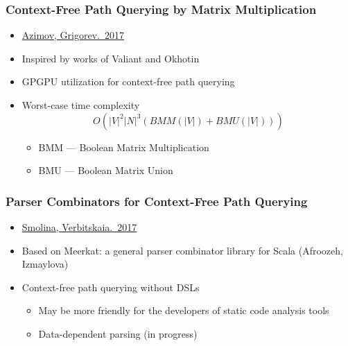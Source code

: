 \documentclass[xcolor=table]{beamer}
\begin{document}
\begin{frame}
  \transwipe[direction=90]
  \frametitle{Context-Free Path Querying by Matrix Multiplication}
  \begin{itemize}
    \item \href{https://arxiv.org/abs/1707.01007}{Azimov, Grigorev.~2017}
    \item Inspired by works of Valiant and Okhotin    
    \item GPGPU utilization for context-free path querying
    \item Worst-case time complexity $$O(|V|^2 |N|^3 (BMM(|V|) + BMU(|V|)))$$
    \begin{itemize}
      \item BMM --- Boolean Matrix Multiplication
      \item BMU --- Boolean Matrix Union
    \end{itemize}

  \end{itemize}
\end{frame}

\begin{frame}
  \transwipe[direction=90]
  \frametitle{Parser Combinators for Context-Free Path Querying}
  \begin{itemize}
    \item \href{http://plc.sfedu.ru/files/PLC-2017-proceedings.pdf\#page=233}{Smolina, Verbitskaia.~2017}
    \item Based on Meerkat: a general parser combinator library for Scala (Afroozeh, Izmaylova)
    \item Context-free path querying without DSLs
    \begin{itemize}
    \item May be more friendly for the developers of static code analysis tools
    \item Data-dependent parsing (in progress)
    \end{itemize}
  \end{itemize}
\end{frame}
\end{document}

